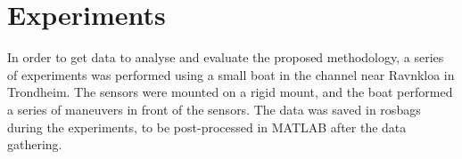
\chapter{Experiments}
In order to get data to analyse and evaluate the proposed methodology, a series of experiments was performed using a small boat in the channel near Ravnkloa in Trondheim. The sensors were mounted on a rigid mount, and the boat performed a series of maneuvers in front of the sensors. The data was saved in rosbags during the experiments, to be post-processed in MATLAB after the data gathering.
\cleardoublepage